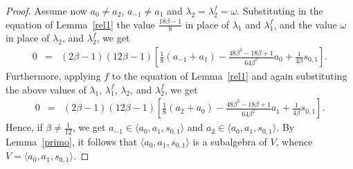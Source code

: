 \documentclass[a4paper]{amsart}
\newcommand{\lmu}{\lambda_1}
\newcommand{\lmf}{\lambda_1^f}
\newcommand{\lmd}{\lambda_2}
\newcommand{\lmdf}{\lambda_2^f}
\newcommand{\bt}{\beta}
\begin{document}
\begin{proof}
Assume now $a_0\neq a_2$, $a_{-1}\neq a_1$ and $\lmd=\lmdf=\omega$. Substituting in the equation of Lemma~\ref{rel1} the value $\frac{18\bt-1}{8}$ in place of $\lmu$ and $\lmf$, and the value $\omega$ in place of $\lmd$, and $\lmdf$, we get 
\begin{eqnarray*}
0&=&(2\bt-1)(12\bt-1)\left [\frac{1}{8}(a_{-1}+a_1)-\frac{48\bt^2-18\bt+1}{64\bt^2}a_0+\frac{1}{4\bt}s_{0,1}\right ].
\end{eqnarray*}
Furthermore, applying $f$ to the equation of Lemma~\ref{rel1} and again substituting the above values of $\lmu$, $\lmf$, $\lmd$, and $\lmdf$, we get 
\begin{eqnarray*}
0&=&(2\bt-1)(12\bt-1)\left [\frac{1}{8}(a_{2}+a_0)-\frac{48\bt^2-18\bt+1}{64\bt^2}a_1+\frac{1}{4\bt}s_{0,1}\right ].
\end{eqnarray*}
Hence, if $\bt\neq \tfrac{1}{12}$, we get $a_{-1}\in \langle a_0, a_1, s_{0,1}\rangle$ and  
$a_{2}\in \langle a_0, a_1, s_{0,1}\rangle$. By Lemma~\ref{primo}, it follows that $\langle a_0, a_1, s_{0,1}\rangle$ is a subalgebra of $V$, whence $V=\langle a_0, a_1, s_{0,1}\rangle$.


\end{proof}
\end{document}

